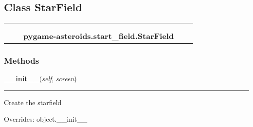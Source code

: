 
\subsection{Class StarField}

    \label{pygame-asteroids:start_field:StarField}
\begin{tabular}{cccccc}
\multicolumn{2}{r}{\settowidth{\BCL}{object}\multirow{2}{\BCL}{object}}
&&
  \\\cline{3-3}
  &&\multicolumn{1}{c|}{}
&&
  \\
&&\multicolumn{2}{l}{\textbf{pygame-asteroids.start\_field.StarField}}
\end{tabular}



  \subsubsection{Methods}

    \vspace{0.5ex}

\hspace{.8\funcindent}\begin{boxedminipage}{\funcwidth}

    \raggedright \textbf{\_\_init\_\_}(\textit{self}, \textit{screen})

    \vspace{-1.5ex}

    \rule{\textwidth}{0.5\fboxrule}
\setlength{\parskip}{2ex}
    Create the starfield

\setlength{\parskip}{1ex}
      Overrides: object.\_\_init\_\_

    \end{boxedminipage}

    \label{pygame-asteroids:start_field:StarField:move}

